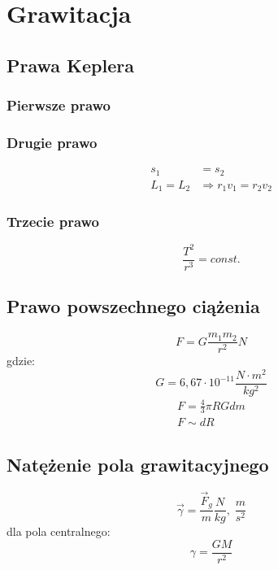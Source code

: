   \chapter{Grawitacja}
    \section{Prawa Keplera}
      \subsection{Pierwsze prawo}
      \subsection{Drugie prawo}
        \begin{align}
          s_1 &= s_2\\
          L_1 = L_2 &\Rightarrow r_1v_1 = r_2v_2
        \end{align}
      \subsection{Trzecie prawo}
        \begin{equation}
          \frac{T^2}{r^3} = const.
        \end{equation}
    \section{Prawo powszechnego ciążenia}
      \begin{equation}
        F = G\frac{m_1m_2}{r^2} \unit{N}
      \end{equation}
      gdzie:
      \begin{equation}
        G = 6,67\cdot 10^{-11} \unit{\frac{N\cdot m^2}{kg^2}}
      \end{equation}
      \begin{gather}
        F = \frac{4}{3}\pi RGdm\\
        F \sim dR
      \end{gather}
    \section{Natężenie pola grawitacyjnego}
      \begin{equation}
        \vec\gamma = \frac{\vec F_g}{m} \unit{\frac{N}{kg},\;\frac{m}{s^2}}
      \end{equation}
      dla pola centralnego:
      \begin{equation}
        \gamma = \frac{GM}{r^2}
      \end{equation}
